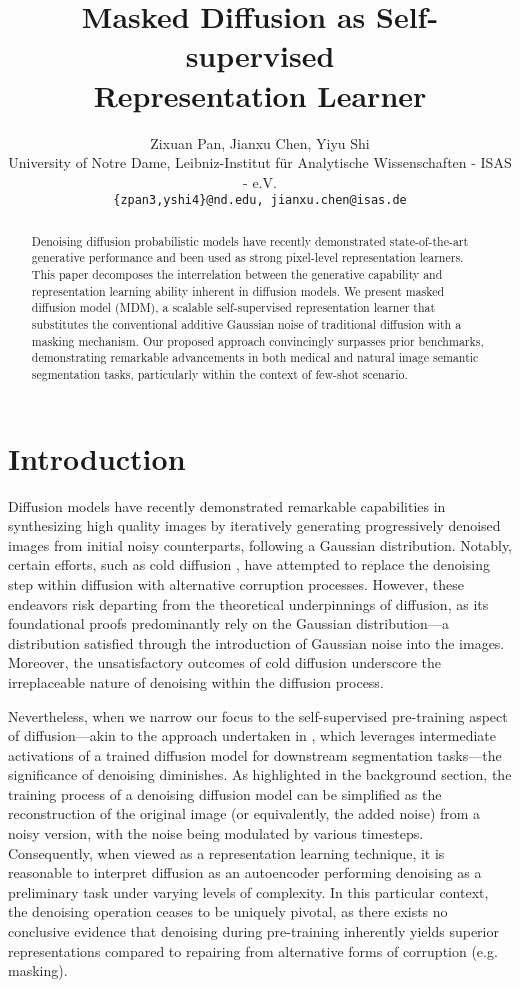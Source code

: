 \documentclass{article} \usepackage{iclr2024_conference,times}
\title{Masked Diffusion as Self-supervised \\ Representation Learner}
\author{Zixuan Pan, Jianxu Chen, Yiyu Shi\\
University of Notre Dame, Leibniz-Institut für Analytische Wissenschaften - ISAS - e.V.\\
\texttt{\{zpan3,yshi4\}@nd.edu, jianxu.chen@isas.de} \\
}
\begin{document}
\maketitle

\begin{abstract}
Denoising diffusion probabilistic models have recently demonstrated state-of-the-art generative performance and been used as strong pixel-level representation learners. This paper decomposes the interrelation between the generative capability and representation learning ability inherent in diffusion models. We present masked diffusion model (MDM), a scalable self-supervised representation learner that substitutes the conventional additive Gaussian noise of traditional diffusion with a masking mechanism. Our proposed approach convincingly surpasses prior benchmarks, demonstrating remarkable advancements in both medical and natural image semantic segmentation tasks, particularly within the context of few-shot scenario.
\end{abstract}

\section{Introduction}


Diffusion models \citep{DBLP:conf/icml/Sohl-DicksteinW15,DBLP:conf/nips/HoJA20} have recently demonstrated remarkable capabilities in synthesizing high quality images by iteratively generating progressively denoised images from initial noisy counterparts, following a Gaussian distribution.  Notably, certain efforts, such as cold diffusion \citep{bansal2022cold}, have attempted to replace the denoising step within diffusion with alternative corruption processes. However, these endeavors risk departing from the theoretical underpinnings of diffusion, as its foundational proofs predominantly rely on the Gaussian distribution—a distribution satisfied through the introduction of Gaussian noise into the images. Moreover, the unsatisfactory outcomes of cold diffusion underscore the irreplaceable nature of denoising within the diffusion process.

Nevertheless, when we narrow our focus to the self-supervised pre-training aspect of diffusion—akin to the approach undertaken in \citet{DBLP:conf/iclr/BaranchukVRKB22}, which leverages intermediate activations of a trained diffusion model for downstream segmentation tasks—the significance of denoising diminishes. 
As highlighted in the background section, the training process of a denoising diffusion model can be simplified as the reconstruction of the original image (or equivalently, the added noise) from a noisy version, with the noise being modulated by various timesteps. Consequently, when viewed as a representation learning technique, it is reasonable to interpret diffusion as an autoencoder performing denoising as a preliminary task under varying levels of complexity.
In this particular context, the denoising operation ceases to be uniquely pivotal, as there exists no conclusive evidence that denoising during pre-training inherently yields superior representations compared to repairing from alternative forms of corruption (e.g. masking).
\end{document}
